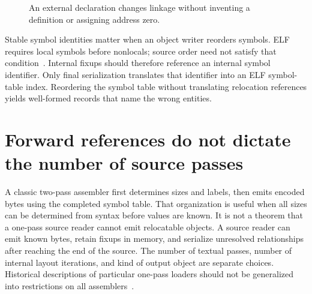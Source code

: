 \begin{figure}[htbp]
\centering
{}
\caption{An external declaration changes linkage without inventing a definition or assigning address zero.}
\label{fig:ch53-symbol-states}
\end{figure}

Stable symbol identities matter when an object writer reorders symbols.
ELF requires local symbols before nonlocals; source order need not satisfy that condition~\cite{xinuos-2026-elf}.
Internal fixups should therefore reference an internal symbol identifier.
Only final serialization translates that identifier into an ELF symbol-table index.
Reordering the symbol table without translating relocation references yields well-formed records that name the wrong entities.

\section{Forward references do not dictate the number of source passes}
\label{sec:ch53-passes}

A classic two-pass assembler first determines sizes and labels, then emits encoded bytes using the completed symbol table.
That organization is useful when all sizes can be determined from syntax before values are known.
It is not a theorem that a one-pass source reader cannot emit relocatable objects.
A source reader can emit known bytes, retain fixups in memory, and serialize unresolved relationships after reaching the end of the source.
The number of textual passes, number of internal layout iterations, and kind of output object are separate choices.
Historical descriptions of particular one-pass loaders should not be generalized into restrictions on all assemblers~\cite{salomon-1993-assemblers}.

